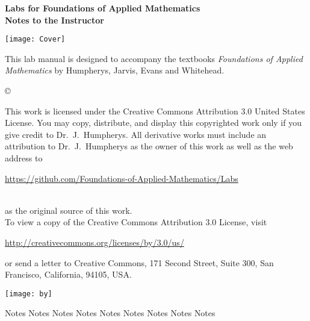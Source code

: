 \documentclass[nociteref]{SIAM-GH-book}
\begin{document}

\thispagestyle{empty} %

\begin{center}
{\huge \bf Labs for Foundations of Applied Mathematics} \\
\vspace{5mm}
{\Large \bf Notes to the Instructor}
\vspace{20mm}

\texttt{[image: Cover]}
\end{center}
\frontmatter



\begin{thepreface} %

This lab manual is designed to accompany the textbooks \emph{Foundations of Applied Mathematics} by Humpherys, Jarvis, Evans and Whitehead.

\vfill
\copyright{This work is licensed under the Creative Commons Attribution 3.0 United States
License.  You may copy, distribute, and display this copyrighted work only if you give
credit to Dr.~J.~Humpherys. All derivative works must include an attribution to Dr.~J.~Humpherys as the owner of this work as well as the web address to
\\\centerline{\url{https://github.com/Foundations-of-Applied-Mathematics/Labs}}\\as the original source of this work.
\\To view a copy of the Creative Commons Attribution 3.0 License, visit
\\\centerline{\url{http://creativecommons.org/licenses/by/3.0/us/}} or send a letter to Creative Commons, 171 Second Street, Suite 300, San Francisco, California, 94105, USA.}

\vfill
\centering\texttt{[image: by]}
\vfill
\end{thepreface}

\setcounter{tocdepth}{1}
\tableofcontents

\mainmatter %

\begin{appendices}
{Notes}
{Notes}
{Notes}
{Notes}
{Notes}
{Notes}
{Notes}
{Notes}
{Notes}
\end{appendices}
\end{document}

